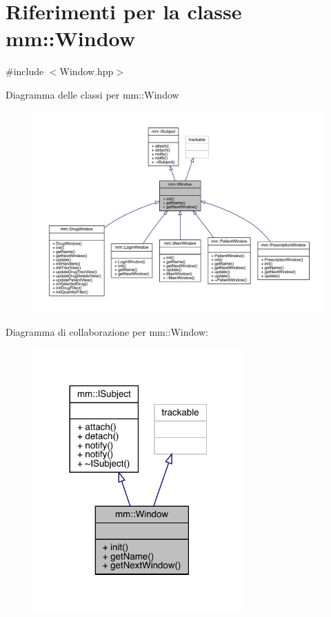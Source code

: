 \hypertarget{classmm_1_1_window}{}\section{Riferimenti per la classe mm\+:\+:Window}
\label{classmm_1_1_window}


{\ttfamily \#include $<$Window.\+hpp$>$}



Diagramma delle classi per mm\+:\+:Window\nopagebreak
\begin{figure}[H]
\begin{center}
\leavevmode
\includegraphics[width=350pt]{d8/dab/classmm_1_1_window__inherit__graph}
\end{center}
\end{figure}


Diagramma di collaborazione per mm\+:\+:Window\+:\nopagebreak
\begin{figure}[H]
\begin{center}
\leavevmode
\includegraphics[width=228pt]{d3/d0c/classmm_1_1_window__coll__graph}
\end{center}
\end{figure}
